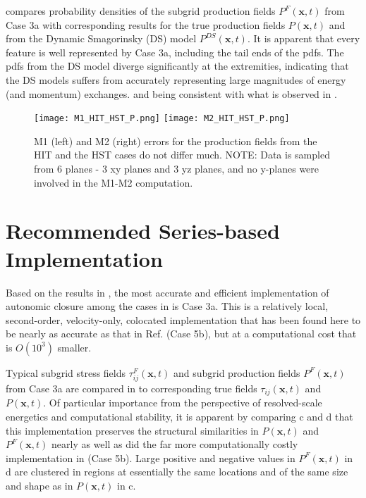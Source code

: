  compares probability densities of the subgrid production fields $P^F(\mathbf{x},t)$ from Case 3a with corresponding results for the true production fields $P(\mathbf{x},t)$  and from the Dynamic Smagorinsky (DS) model $P^{DS}(\mathbf{x},t)$. It is apparent that every feature is well represented by Case 3a, including the tail ends of the pdfs. The pdfs from the DS model diverge significantly at the extremities, indicating that the DS models suffers from accurately representing large magnitudes of energy (and momentum) exchanges. and being consistent with what is observed in . 



%
\begin{figure}
	\begin{center}
	\texttt{[image: M1\_HIT\_HST\_P.png]}
	\texttt{[image: M2\_HIT\_HST\_P.png]}
	\caption{M1 (left) and M2 (right) errors for the production fields from the HIT and the HST cases do not differ much. NOTE: Data is sampled from 6 planes - 3 xy planes and 3 yz planes, and no y-planes were involved in the M1-M2 computation.}
	\label{F:M1M2_HST}
	\end{center}
\end{figure}
%
%



\section{Recommended  Series-based Implementation}
\label{sec:IVG}

Based on the results in , the most accurate and efficient implementation of autonomic closure among the cases in  is Case 3a. This is a relatively local, second-order, velocity-only, colocated implementation that has been found here to be nearly as accurate as that in Ref.  \cite{king2016autonomic} (Case 5b), but at a computational cost that is $O(10^3)$ smaller.  

Typical subgrid stress fields  $\tau_{ij}^{F}(\mathbf{x},t)$ and subgrid production fields $P^{F}(\mathbf{x},t)$  from Case 3a are compared in  to corresponding true fields $\tau_{ij}(\mathbf{x},t)$  and $P(\mathbf{x},t)$. Of particular importance from the perspective of resolved-scale energetics and computational stability, it is apparent by comparing c and d that this implementation preserves the structural similarities in  $P(\mathbf{x},t)$ and $P^{F}(\mathbf{x},t)$  nearly as well as did the far more computationally costly implementation in  (Case 5b). Large positive and negative values in $P^{F}(\mathbf{x},t)$ in d are clustered in regions at essentially the same locations and of the same size and shape as in $P(\mathbf{x},t)$  in c. 

